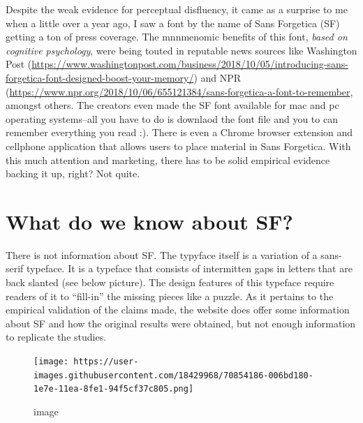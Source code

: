 \documentclass[doc]{apa6}
\begin{document}
Despite the weak evidence for perceptual disfluency, it came as a surprise to me when a little over a year ago, I saw a font by the name of Sans Forgetica (SF) getting a ton of press coverage. The mnnmenomic benefits of this font, \emph{based on cognitive psychology}, were being touted in reputable news sources like Washington Post (\url{https://www.washingtonpost.com/business/2018/10/05/introducing-sans-forgetica-font-designed-boost-your-memory/}) and NPR (\url{https://www.npr.org/2018/10/06/655121384/sans-forgetica-a-font-to-remember}, amongst others. The creators even made the SF font available for mac and pc operating systems--all you have to do is downlaod the font file and you to can remember everything you read :). There is even a Chrome browser extension and cellphone application that allows users to place material in Sans Forgetica. With this much attention and marketing, there has to be solid empirical evidence backing it up, right? Not quite.

\hypertarget{what-do-we-know-about-sf}{%
\section{What do we know about SF?}\label{what-do-we-know-about-sf}}

There is not information about SF. The typyface itself is a variation of a sans-serif typeface. It is a typeface that consists of intermitten gaps in letters that are back slanted (see below picture). The design features of this typeface require readers of it to \enquote{fill-in} the missing pieces like a puzzle. As it pertains to the empirical validation of the claims made, the website does offer some information about SF and how the original results were obtained, but not enough information to replicate the studies.

\begin{figure}
\centering
\texttt{[image: https://user-images.githubusercontent.com/18429968/70854186-006bd180-1e7e-11ea-8fe1-94f5cf37c805.png]}
\caption{image}
\end{figure}
\end{document}
